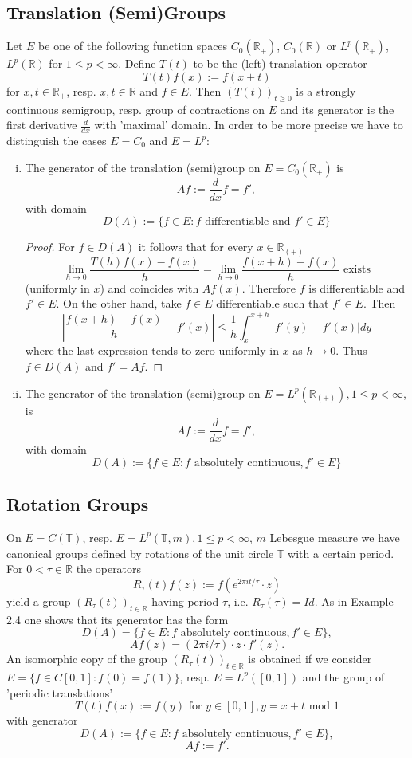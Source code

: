 \subsection{Translation (Semi)Groups}
Let $E$ be one of the following function spaces $C_0(\mathbb{R}_+)$, $C_0(\mathbb{R})$ or $L^p(\mathbb{R}_+)$, $L^p(\mathbb{R})$ for $1 \leq p < \infty$.
Define $T(t)$ to be the (left) translation operator
\[
T(t)f(x) := f(x+t)
\]
for $x,t \in \mathbb{R}_+$, resp. $x,t \in \mathbb{R}$ and $f \in E$.
Then $(T(t))_{t \geq 0}$ is a strongly continuous semigroup, resp. group of contractions on $E$ and its generator is the first derivative $\frac{d}{dx}$ with 'maximal' domain.
In order to be more precise we have to distinguish the cases $E=C_0$ and $E=L^p$:

\begin{enumerate}[(i)]

\item
The generator of the translation (semi)group on $E=C_0(\mathbb{R}_+)$ is
\[
Af := \frac{d}{dx}f = f',
\]
with domain 
\[
D(A) := \{f \in E: f \text{ differentiable and } f' \in E\}
\]
\begin{proof} For $f \in D(A)$ it follows that for every $x \in \mathbb{R}_{(+)}$
\[
\lim_{h \to 0} \frac{T(h)f(x)-f(x)}{h} = \lim_{h \to 0} \frac{f(x+h)-f(x)}{h} \text{ exists}
\]
(uniformly in $x$) and coincides with $Af(x)$.
Therefore $f$ is differentiable and $f' \in E$.
On the other hand, take $f \in E$ differentiable such that $f' \in E$.
Then
\[
\left|\frac{f(x+h)-f(x)}{h}-f'(x)\right| \leq \frac{1}{h} \int_{x}^{x+h}|f'(y)-f'(x)| dy
\]
where the last expression tends to zero uniformly in $x$ as $h \to 0$.
Thus $f \in D(A)$ and $f' = Af$.
\end{proof}

\item 
The generator of the translation (semi)group on $E=L^p(\mathbb{R}_{(+)}), 1 \leq p < \infty$, is
\[
Af := \frac{d}{dx}f = f',
\]
with domain
\[
D(A) := \{f \in E: f \text{ absolutely continuous}, f' \in E\}
\]
\end{enumerate}
\subsection{Rotation Groups}
On $E=C(\mathbb{T})$, resp. $E=L^p(\mathbb{T},m), 1 \leq p < \infty$, $m$ Lebesgue measure we have canonical groups defined by rotations of the unit circle $\mathbb{T}$ with a certain period.
For $0 < \tau \in \mathbb{R}$ the operators
\[
R_\tau(t)f(z) := f(e^{2\pi it/\tau} \cdot z)
\]
yield a group $(R_\tau(t))_{t \in \mathbb{R}}$ having period $\tau$, i.e. $R_\tau(\tau)=Id$.
As in Example 2.4 one shows that its generator has the form
\[
D(A) = \{f \in E: f \text{ absolutely continuous}, f' \in E\},
\]
\[
Af(z) = (2\pi i/\tau) \cdot z \cdot f'(z).
\]
An isomorphic copy of the group $(R_\tau(t))_{t \in \mathbb{R}}$ is obtained if we consider $E=\{f \in C[0,1]: f(0)=f(1)\}$, resp. $E=L^p([0,1])$ and the group of 'periodic translations'
\[
T(t)f(x) := f(y) \text{ for } y \in [0,1], y = x+t \text{ mod } 1
\]
with generator
\[
D(A) := \{f \in E: f \text{ absolutely continuous}, f' \in E\},
\]
\[
Af := f'.
\]
